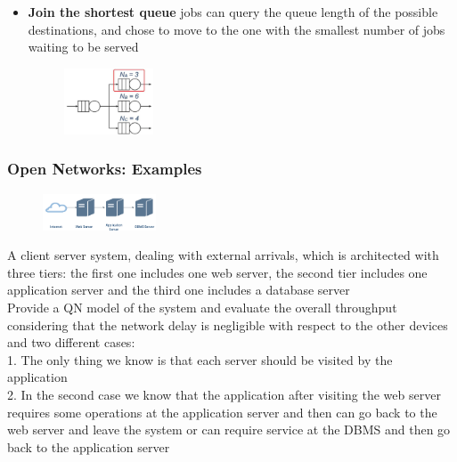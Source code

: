 \documentclass[10pt, oneside]{article}
\begin{document}
\begin{itemize}
\begin{itemize}
\begin{figure}[H]
\begin{center}
            \end{center}
        \end{figure}
    \item {\bf Join the shortest queue} jobs can query the queue length of the possible destinations, and chose
    to move to the one with the smallest number of jobs waiting to be served\begin{figure}[H]
        \begin{center}
            \includegraphics[width=0.25\textwidth]{img/img107.png}
            \end{center}
        \end{figure}
   
\end{itemize}
\end{itemize}\newpage
\subsubsection*{Open Networks: Examples}\begin{figure}[H]
    \begin{center}
        \includegraphics[width=0.3\textwidth]{img/img108.png}
        \end{center}
    \end{figure}A client server system, dealing with external arrivals, which is architected with three tiers: the first one includes one web server, the second tier includes one application server and the third one includes a database server\\
    Provide a QN model of the system and evaluate the overall throughput considering that the network delay is negligible with respect to the other devices and two different cases:\\
    1.  The only thing we know is that each server should be visited by the application\\
    2.  In the second case we know that the application after visiting the web server requires some operations at the application server and then can go back to the web server and leave the system or can require service at the DBMS and then go back to the application server
\end{document}
